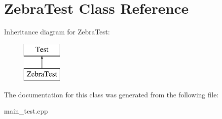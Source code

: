 \hypertarget{class_zebra_test}{}\section{Zebra\+Test Class Reference}
\label{class_zebra_test}
Inheritance diagram for Zebra\+Test\+:\begin{figure}[H]
\begin{center}
\leavevmode
\includegraphics[height=2.000000cm]{class_zebra_test}
\end{center}
\end{figure}


The documentation for this class was generated from the following file\+:\begin{DoxyCompactItemize}
\item 
main\+\_\+test.\+cpp\end{DoxyCompactItemize}
